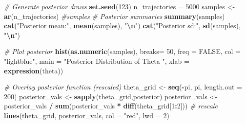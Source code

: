 \documentclass[12pt,halfline,a4paper,]{ouparticle}
\newenvironment{Shaded}{\begin{snugshade}}{\end{snugshade}}
\newcommand{\AttributeTok}[1]{\textcolor[rgb]{0.13,0.29,0.53}{#1}}
\newcommand{\CommentTok}[1]{\textcolor[rgb]{0.56,0.35,0.01}{\textit{#1}}}
\newcommand{\ConstantTok}[1]{\textcolor[rgb]{0.56,0.35,0.01}{#1}}
\newcommand{\DecValTok}[1]{\textcolor[rgb]{0.00,0.00,0.81}{#1}}
\newcommand{\FunctionTok}[1]{\textcolor[rgb]{0.13,0.29,0.53}{\textbf{#1}}}
\newcommand{\NormalTok}[1]{#1}
\newcommand{\OtherTok}[1]{\textcolor[rgb]{0.56,0.35,0.01}{#1}}
\newcommand{\SpecialCharTok}[1]{\textcolor[rgb]{0.81,0.36,0.00}{\textbf{#1}}}
\newcommand{\StringTok}[1]{\textcolor[rgb]{0.31,0.60,0.02}{#1}}
\begin{document}
\begin{Shaded}
\begin{Highlighting}[]
\CommentTok{\# Generate posterior draws}
\FunctionTok{set.seed}\NormalTok{(}\DecValTok{123}\NormalTok{)}
\NormalTok{n\_trajectories }\OtherTok{=} \DecValTok{5000}
\NormalTok{samples }\OtherTok{\textless{}{-}} \FunctionTok{ar}\NormalTok{(n\_trajectories)}
\CommentTok{\#samples}
\CommentTok{\# Posterior summaries}
\FunctionTok{summary}\NormalTok{(samples)}
\FunctionTok{cat}\NormalTok{(}\StringTok{"Posterior mean:"}\NormalTok{, }\FunctionTok{mean}\NormalTok{(samples), }\StringTok{"}\SpecialCharTok{\textbackslash{}n}\StringTok{"}\NormalTok{)}
\FunctionTok{cat}\NormalTok{(}\StringTok{"Posterior sd:"}\NormalTok{, }\FunctionTok{sd}\NormalTok{(samples), }\StringTok{"}\SpecialCharTok{\textbackslash{}n}\StringTok{"}\NormalTok{)}

\CommentTok{\# Plot posterior}
\FunctionTok{hist}\NormalTok{(}\FunctionTok{as.numeric}\NormalTok{(samples), }\AttributeTok{breaks=} \DecValTok{50}\NormalTok{, }\AttributeTok{freq =} \ConstantTok{FALSE}\NormalTok{,}
     \AttributeTok{col =} \StringTok{"lightblue"}\NormalTok{, }\AttributeTok{main =} \StringTok{"Posterior Distribution of Theta "}\NormalTok{,}
     \AttributeTok{xlab =} \FunctionTok{expression}\NormalTok{(theta))}

\CommentTok{\# Overlay posterior function (rescaled)}
\NormalTok{theta\_grid }\OtherTok{\textless{}{-}} \FunctionTok{seq}\NormalTok{(}\SpecialCharTok{{-}}\NormalTok{pi, pi, }\AttributeTok{length.out =} \DecValTok{200}\NormalTok{)}
\NormalTok{posterior\_vals }\OtherTok{\textless{}{-}} \FunctionTok{sapply}\NormalTok{(theta\_grid,posterior)}
\NormalTok{posterior\_vals }\OtherTok{\textless{}{-}}\NormalTok{ posterior\_vals }\SpecialCharTok{/} \FunctionTok{sum}\NormalTok{(posterior\_vals }\SpecialCharTok{*} \FunctionTok{diff}\NormalTok{(theta\_grid[}\DecValTok{1}\SpecialCharTok{:}\DecValTok{2}\NormalTok{]))  }\CommentTok{\# rescale}
\FunctionTok{lines}\NormalTok{(theta\_grid, posterior\_vals, }\AttributeTok{col =} \StringTok{"red"}\NormalTok{, }\AttributeTok{lwd =} \DecValTok{2}\NormalTok{)}


\end{Highlighting}
\end{Shaded}
\end{document}
